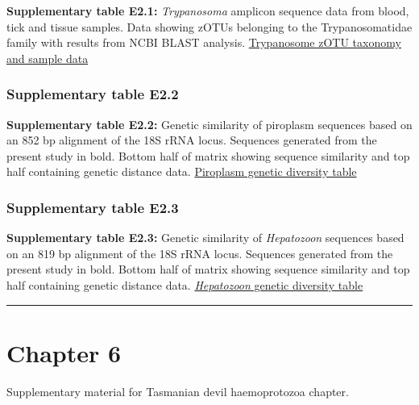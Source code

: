 \documentclass[a4paper, nobind]{templates/ociamthesis}
\begin{document}
\textbf{Supplementary table E2.1:} \emph{Trypanosoma} amplicon sequence data from blood, tick and tissue samples. Data showing zOTUs belonging to the Trypanosomatidae family with results from NCBI BLAST analysis. \href{https://figshare.com/ndownloader/files/30578460}{Trypanosome zOTU taxonomy and sample data}

\hypertarget{supplementary-table-e2.2}{%
\subsubsection{Supplementary table E2.2}\label{supplementary-table-e2.2}}

\textbf{Supplementary table E2.2:} Genetic similarity of piroplasm sequences based on an 852 bp alignment of the 18S rRNA locus. Sequences generated from the present study in bold. Bottom half of matrix showing sequence similarity and top half containing genetic distance data.
\href{https://figshare.com/ndownloader/files/30578457}{Piroplasm genetic diversity table}

\hypertarget{supplementary-table-e2.3}{%
\subsubsection{Supplementary table E2.3}\label{supplementary-table-e2.3}}

\textbf{Supplementary table E2.3:} Genetic similarity of \emph{Hepatozoon} sequences based on an 819 bp alignment of the 18S rRNA locus. Sequences generated from the present study in bold. Bottom half of matrix showing sequence similarity and top half containing genetic distance data.
\href{https://figshare.com/ndownloader/files/30578463}{\emph{Hepatozoon} genetic diversity table}

\begin{center}\rule{0.5\linewidth}{0.5pt}\end{center}

\clearpage

\hypertarget{ch6-supp}{%
\section{Chapter 6}\label{ch6-supp}}

Supplementary material for Tasmanian devil haemoprotozoa chapter.
\end{document}
